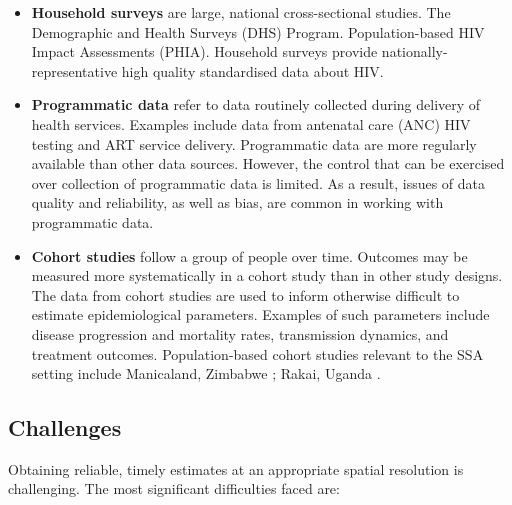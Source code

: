\documentclass[a4paper, nobind]{templates/ociamthesis}
\begin{document}
\begin{itemize}
\item
  \textbf{Household surveys} are large, national cross-sectional studies.
  The Demographic and Health Surveys (DHS) Program.
  Population-based HIV Impact Assessments (PHIA).
  Household surveys provide nationally-representative high quality standardised data about HIV.
\item
  \textbf{Programmatic data} refer to data routinely collected during delivery of health services.
  Examples include data from antenatal care (ANC) HIV testing and ART service delivery.
  Programmatic data are more regularly available than other data sources.
  However, the control that can be exercised over collection of programmatic data is limited.
  As a result, issues of data quality and reliability, as well as bias, are common in working with programmatic data.
\item
  \textbf{Cohort studies} follow a group of people over time.
  Outcomes may be measured more systematically in a cohort study than in other study designs.
  The data from cohort studies are used to inform otherwise difficult to estimate epidemiological parameters.
  Examples of such parameters include disease progression and mortality rates, transmission dynamics, and treatment outcomes.
  Population-based cohort studies relevant to the SSA setting include Manicaland, Zimbabwe \autocite{gregson2006hiv}; Rakai, Uganda \autocite{grabowski2017hiv}.
\end{itemize}

\hypertarget{challenges}{%
\subsection{Challenges}\label{challenges}}

Obtaining reliable, timely estimates at an appropriate spatial resolution is challenging.
The most significant difficulties faced are:
\end{document}
